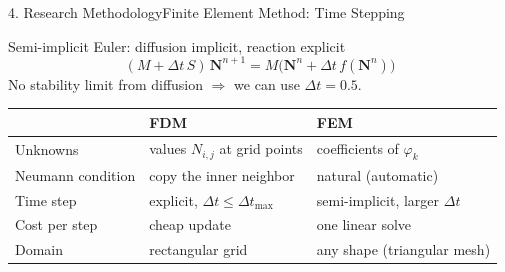 \documentclass[10pt]{beamer}
\begin{document}
    \begin{frame}{4. Research Methodology}{Finite Element Method: Time Stepping}
      \begin{block}{Semi-implicit Euler: diffusion implicit, reaction explicit}
          $$
          (M + \Delta t\, S)\,\mathbf{N}^{n+1} = M\big(\mathbf{N}^{n} + \Delta t\, f(\mathbf{N}^{n})\big)
          $$
          No stability limit from diffusion $\Rightarrow$ we can use $\Delta t = 0.5$.
      \end{block}
      \begin{center}
        \small
        \renewcommand{\arraystretch}{1.3}
        \begin{tabular}{l l l}
          \hline
          & \textbf{FDM} & \textbf{FEM} \\
          \hline
          Unknowns & values $N_{i,j}$ at grid points & coefficients of $\varphi_k$ \\
          Neumann condition & copy the inner neighbor & natural (automatic) \\
          Time step & explicit, $\Delta t \le \Delta t_{\max}$ & semi-implicit, larger $\Delta t$ \\
          Cost per step & cheap update & one linear solve \\
          Domain & rectangular grid & any shape (triangular mesh) \\
          \hline
        \end{tabular}
      \end{center}
    \end{frame}
\end{document}
